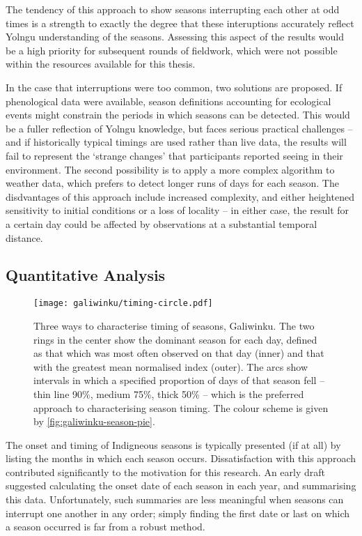 The tendency of this approach to show seasons interrupting each other at odd
times is a strength to exactly the degree that these interuptions accurately
reflect Yolngu understanding of the seasons.  Assessing this aspect of the
results would be a high priority for subsequent rounds of fieldwork, which
were not possible within the resources available for this thesis.

In the case that interruptions were too common, two solutions are proposed.
If phenological data were available, season definitions accounting for
ecological events might constrain the periods in which seasons can be detected.
This would be a fuller reflection of Yolngu knowledge, but faces serious
practical challenges -- and if historically typical timings are used rather
than live data, the results will fail to represent the `strange changes'
that participants reported seeing in their environment.
%
The second  possibility is to apply a more complex algorithm to weather data,
which prefers to detect longer runs of days for each season.  The disdvantages
of this approach include increased complexity, and either heightened sensitivity
to initial conditions or a loss of locality -- in either case, the result for
a certain day could be affected by observations at a substantial temporal distance.


\subsection{Quantitative Analysis}
\label{subsec:disc-season-characterisation}

\begin{figure}[p]
    \centerline{
    \texttt{[image: galiwinku/timing-circle.pdf]}}
    \caption[Three ways to characterise timing of seasons, Galiwinku]{
        Three ways to characterise timing of seasons, Galiwinku.
        The two rings in the center show the dominant season for each day,
        defined as that which was most often observed on that day (inner)
        and that with the greatest mean normalised index (outer).
        The arcs show intervals in which a specified proportion of days
        of that season fell -- thin line 90\%, medium 75\%, thick 50\% --
        which is the preferred approach to characterising season timing.
        The colour scheme is given by \cref{fig:galiwinku-season-pie}.
        }
    \label{fig:galiwinku-timing-circle}
\end{figure}

The onset and timing of Indigneous seasons is typically presented (if at all)
by listing the months in which each season occurs.  Dissatisfaction with this
approach contributed significantly to the motivation for this research.
%
An early draft suggested calculating the onset date of each season in each
year, and summarising this data.  Unfortunately, such summaries are less
meaningful when seasons can interrupt one another in any order; simply finding
the first date or last on which a season occurred is far from a robust method.

